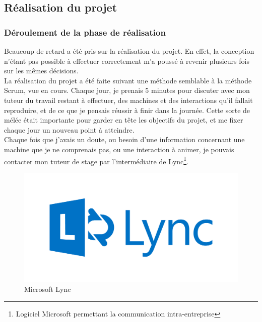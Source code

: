 \documentclass[a4paper]{article}
\begin{document}
    \newpage

    \subsection{Réalisation du projet}

    \subsubsection{Déroulement de la phase de réalisation}
    Beaucoup de retard a été pris sur la réalisation du projet. En effet, la conception n'étant pas possible à effectuer correctement m'a poussé à revenir plusieurs fois sur les mêmes décisions. \\

    La réalisation du projet a été faite suivant une méthode semblable à la méthode Scrum, vue en cours. Chaque jour, je prenais 5 minutes pour discuter avec mon tuteur du travail restant à effectuer, des machines et des interactions qu'il fallait reproduire, et de ce que je pensais réussir à finir dans la journée. Cette sorte de mélée était importante pour garder en tête les objectifs du projet, et me fixer chaque jour un nouveau point à atteindre. \\

    Chaque fois que j'avais un doute, ou besoin d'une information concernant une machine que je ne comprenais pas, ou une interaction à animer, je pouvais contacter mon tuteur de stage par l'intermédiaire de Lync\footnote{Logiciel Microsoft permettant la communication intra-entreprise}. \\

    \begin{figure}[H]
        \centering
        \includegraphics[scale=0.5]{img/logo-lync}
        \caption{Microsoft Lync}
    \end{figure}
\end{document}

